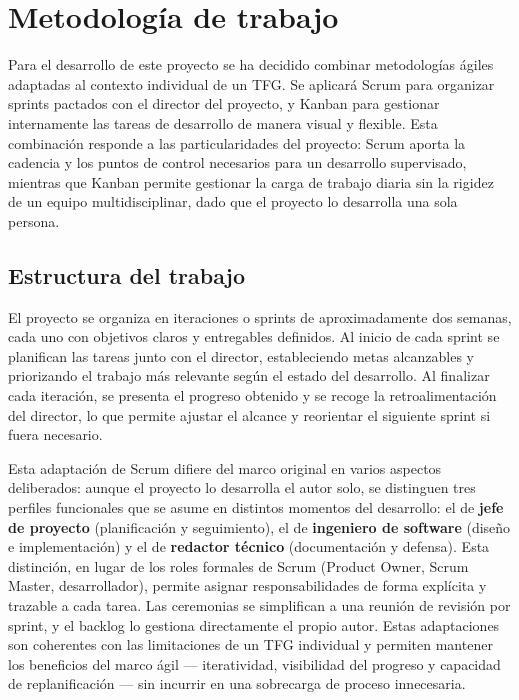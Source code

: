 \documentclass{article}
\begin{document}
    
    \newpage
    \section{Metodología de trabajo}
    {                
        \setlength{\parskip}{1em}

        \justify
        Para el desarrollo de este proyecto se ha decidido combinar metodologías ágiles 
        adaptadas al contexto individual de un TFG. Se aplicará Scrum 
        \cite{kniberg_kanban_2010} para organizar sprints pactados con el director del
        proyecto, y Kanban para gestionar internamente las
        tareas de desarrollo de manera visual y flexible. Esta combinación responde a las 
        particularidades del proyecto: Scrum aporta la cadencia y los puntos de control 
        necesarios para un desarrollo supervisado, mientras que Kanban permite gestionar 
        la carga de trabajo diaria sin la rigidez de un equipo multidisciplinar, dado que 
        el proyecto lo desarrolla una sola persona.

        \subsection{Estructura del trabajo}
        \justify
        El proyecto se organiza en iteraciones o sprints de aproximadamente dos semanas, 
        cada uno con objetivos claros y entregables definidos. Al inicio de cada sprint 
        se planifican las tareas junto con el director, estableciendo metas alcanzables 
        y priorizando el trabajo más relevante según el estado del desarrollo. Al 
        finalizar cada iteración, se presenta el progreso obtenido y se recoge la 
        retroalimentación del director, lo que permite ajustar el alcance y reorientar 
        el siguiente sprint si fuera necesario.

        \justify
        Esta adaptación de Scrum difiere del marco original en varios aspectos deliberados: 
        aunque el proyecto lo desarrolla el autor solo, se distinguen tres perfiles 
        funcionales que se asume en distintos momentos del desarrollo: el de 
        \textbf{jefe de proyecto} (planificación y seguimiento), el de \textbf{ingeniero 
        de software} (diseño e implementación) y el de \textbf{redactor técnico} 
        (documentación y defensa). Esta distinción, en lugar de los roles formales de 
        Scrum (Product Owner, Scrum Master, desarrollador), permite asignar 
        responsabilidades de forma explícita y trazable a cada tarea. Las ceremonias 
        se simplifican a una reunión de revisión por sprint, y el backlog lo gestiona 
        directamente el propio autor. Estas adaptaciones son coherentes con las 
        limitaciones de un TFG individual y permiten mantener los beneficios del marco 
        ágil — iteratividad, visibilidad del progreso y capacidad de
        replanificación — sin incurrir en una sobrecarga de proceso innecesaria.
        \par

}
\end{document}

